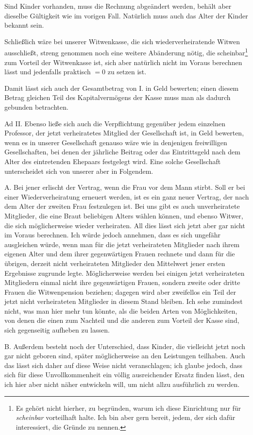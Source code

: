 Sind Kinder vorhanden, muss die Rechnung abgeändert werden, behält aber dieselbe Gültigkeit wie im vorigen Fall. Natürlich muss auch das Alter der Kinder bekannt sein.

Schließlich wäre bei unserer Witwenkasse, die sich wiederverheiratende Witwen ausschließt, streng genommen noch eine weitere Abänderung nötig, die scheinbar\footnote{Es gehört nicht hierher, zu begründen, warum ich diese Einrichtung nur für \textit{scheinbar} vorteilhaft halte. Ich bin aber gern bereit, jedem, der sich dafür interessiert, die Gründe zu nennen.} zum Vorteil der Witwenkasse ist, sich aber natürlich nicht im Voraus berechnen lässt und jedenfalls praktisch \(=0\) zu setzen ist.

Damit lässt sich auch der Gesamtbetrag von I. in Geld bewerten; einen diesem Betrag gleichen Teil des Kapitalvermögens der Kasse muss man als dadurch gebunden betrachten.

Ad II. Ebenso ließe sich auch die Verpflichtung gegenüber jedem einzelnen Professor, der jetzt verheiratetes Mitglied der Gesellschaft ist, in Geld bewerten, wenn es in unserer Gesellschaft genauso wäre wie in denjenigen freiwilligen Gesellschaften, bei denen der jährliche Beitrag oder das Eintrittsgeld nach dem Alter des eintretenden Ehepaars festgelegt wird. Eine solche Gesellschaft unterscheidet sich von unserer aber in Folgendem.

A. Bei jener erlischt der Vertrag, wenn die Frau vor dem Mann stirbt. Soll er bei einer Wiederverheiratung erneuert werden, ist es ein ganz neuer Vertrag, der nach dem Alter der zweiten Frau festzulegen ist. Bei uns gibt es auch unverheiratete Mitglieder, die eine Braut beliebigen Alters wählen können, und ebenso Witwer, die sich möglicherweise wieder verheiraten. All dies lässt sich jetzt aber gar nicht im Voraus berechnen. Ich würde jedoch annehmen, dass es sich ungefähr ausgleichen würde, wenn man für die jetzt verheirateten Mitglieder nach ihrem eigenen Alter und dem ihrer gegenwärtigen Frauen rechnete und dann für die übrigen, derzeit nicht verheirateten Mitglieder den Mittelwert jener ersten Ergebnisse zugrunde legte. Möglicherweise werden bei einigen jetzt verheirateten Mitgliedern einmal nicht ihre gegenwärtigen Frauen, sondern zweite oder dritte Frauen die Witwenpension beziehen; dagegen wird aber zweifellos ein Teil der jetzt nicht verheirateten Mitglieder in diesem Stand bleiben. Ich sehe zumindest nicht, was man hier mehr tun könnte, als die beiden Arten von Möglichkeiten, von denen die einen zum Nachteil und die anderen zum Vorteil der Kasse sind, sich gegenseitig aufheben zu lassen.

B. Außerdem besteht noch der Unterschied, dass Kinder, die vielleicht jetzt noch gar nicht geboren sind, später möglicherweise an den Leistungen teilhaben. Auch das lässt sich daher auf diese Weise nicht veranschlagen; ich glaube jedoch, dass sich für diese Unvollkommenheit ein völlig ausreichender Ersatz finden lässt, den ich hier aber nicht näher entwickeln will, um nicht allzu ausführlich zu werden.

